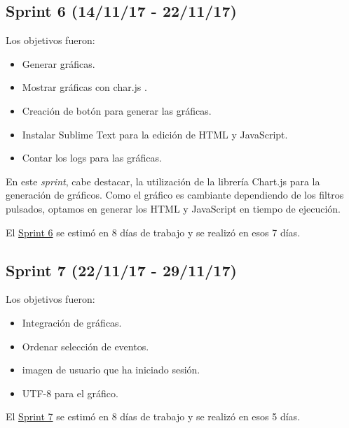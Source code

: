 
\subsection{Sprint 6 (14/11/17 -
	22/11/17)}\label{sprint-6-141117---221117}

Los objetivos fueron:
\begin{itemize}
	\tightlist
	\item
	Generar gráficas.
	\item
	Mostrar gráficas con char.js \cite{javascript:chart}.
	\item
	Creación de botón para generar las gráficas.	
	\item
	Instalar Sublime Text para la edición de HTML y JavaScript.
	\item
	Contar los logs para las gráficas.
	
\end{itemize}

En este \emph{sprint}, cabe destacar, la utilización de la librería Chart.js para la generación de gráficos. Como el gráfico es cambiante dependiendo de los filtros pulsados, optamos en generar los HTML y JavaScript en tiempo de ejecución.

El \href{https://github.com/trona85/GII-17.1B-UBULog-1.0/milestone/6?closed=1}{Sprint 6} se estimó en 8 días de trabajo y se realizó en esos 7 días.


\subsection{Sprint 7 (22/11/17 -
	29/11/17)}\label{sprint-7-221117---291117}

Los objetivos fueron:
\begin{itemize}
	\tightlist
	\item
	Integración de gráficas.
	\item
	Ordenar selección de eventos.
	\item
	imagen de usuario que ha iniciado sesión.	
	\item
	UTF-8 para el gráfico.
	
\end{itemize}

El \href{https://github.com/trona85/GII-17.1B-UBULog-1.0/milestone/7?closed=1}{Sprint 7} se estimó en 8 días de trabajo y se realizó en esos 5 días.


